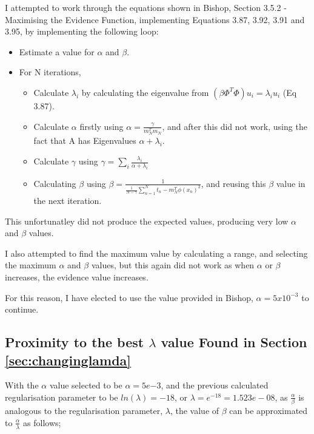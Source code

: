 \documentclass[a4paper, 11pt]{article}
\begin{document}
I attempted to work through the equations shown in Bishop, Section 3.5.2 - Maximising the Evidence Function, implementing Equations 3.87, 3.92, 3.91 and 3.95, by implementing the following loop:
\begin{itemize}
    \item Estimate a value for $\alpha$ and $\beta$.
    \item For N iterations,\begin{itemize}
        \item Calculate $\lambda_i$ by calculating the eigenvalue from $(\beta \Phi ^T \Phi) u_i= \lambda_i u_i $ (Eq 3.87).
        \item Calculate $\alpha$ firstly using $\alpha = \frac{\gamma}{m^T_N m_N}$, and after this did not work, using the fact that A has Eigenvalues $\alpha + \lambda_i$.
        \item Calculate $\gamma$ using $\gamma = \sum_i \frac{\lambda_i}{\alpha + \lambda_i}$
        \item Calculating $\beta$ using $\beta = \frac{1}{\frac{1}{N - \gamma} \sum_{n=1}^{N} {t_n - m_N^T \phi(x_n)}^2}$, and reusing this $\beta$ value in the next iteration.
    \end{itemize}
\end{itemize}

This unfortunatley did not produce the expected values, producing very low $\alpha$ and $\beta$ values.

I also attempted to find the maximum value by calculating a range, and selecting the maximum $\alpha$ and $\beta$ values, but this again did not work as when $\alpha$ or $\beta$ increases, the evidence value increases.

For this reason, I have elected to use the value provided in Bishop, $\alpha = 5x10^{-3}$ to continue. 



\subsection{Proximity to the best $\lambda$ value Found in Section \ref{sec:changinglamda}}

With the $\alpha$ value selected to be $\alpha = 5e{-3}$, and the previous calculated regularisation parameter to be $ln(\lambda) = -18$, or $\lambda = e^{-18} = 1.523e-08$, as $\frac{\alpha}{\beta}$ is analogous to the regularisation parameter, $\lambda$, the value of $\beta$ can be approximated to $\frac{\alpha}{\lambda}$ as follows;
\end{document}
